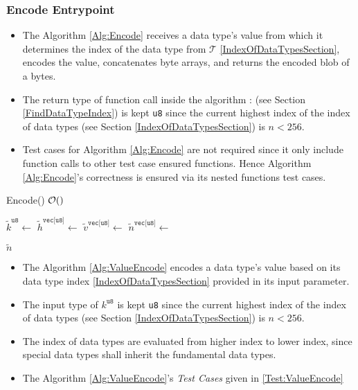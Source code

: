 \documentclass[../alan-handbook.tex]{subfiles}
\begin{document}
\subsubsection{Encode Entrypoint}

\label{Encode}

\begin{itemize}
    \item The Algorithm \ref{Alg:Encode} receives a data type's value from which it determines the index of the data type from $\mathcal{T}$ \ref{IndexOfDataTypesSection}, encodes the value, concatenates byte arrays, and returns the encoded blob of a bytes. 
    \item The return type of function call inside the algorithm :  (see Section \ref{FindDataTypeIndex}) is kept \texttt{u8} since the current highest index of the index of data types (see Section \ref{IndexOfDataTypesSection}) is $n<256$.
    \item Test cases for Algorithm \ref{Alg:Encode} are not required since it only include function calls to other test case ensured functions. Hence Algorithm \ref{Alg:Encode}'s correctness is ensured via its nested functions test cases.
\end{itemize}

\begin{algorithm}
\caption{Encode() \hfill $\mathcal{O}()$  }
\label{Alg:Encode}
\begin{algorithmic}[1]
    \State $\tilde{k}^{\texttt{u8}} \gets$  \Comment{\ref{FindDataTypeIndex}}
        \State $\tilde{h}^{\texttt{vec[u8]}} \gets$  \Comment{\ref{LengthEncode}}
        \State $\tilde{v}^{\texttt{vec[u8]}} \gets$  \Comment{\ref{ValueEncode}}
    \EndConcurrency
    \State $\tilde{n}^{\texttt{vec[u8]}} \gets$  \Comment{\ref{ConcatByteArrays}}

    \Return $\tilde{n}$
\EndFunction
\end{algorithmic}
\end{algorithm}

 \label{ValueEncode}

\begin{itemize}
    \item The Algorithm \ref{Alg:ValueEncode} encodes a data type's value based on its data type index \ref{IndexOfDataTypesSection} provided in its input parameter. 
    \item The input type of $k^{\texttt{u8}}$ is kept \texttt{u8} since the current highest index of the index of data types (see Section \ref{IndexOfDataTypesSection}) is $n<256$.
    \item The index of data types are evaluated from higher index to lower index, since special data types shall inherit the fundamental data types.
    \item The Algorithm \ref{Alg:ValueEncode}'s \textit{Test Cases} given in \ref{Test:ValueEncode}
\end{itemize}
\end{document}
